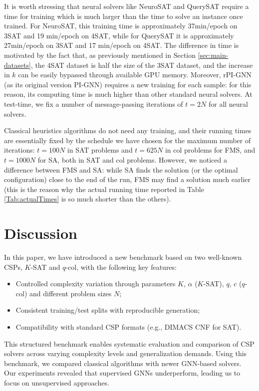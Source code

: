 \documentclass{article}
\begin{document}
It is worth stressing that neural solvers like NeuroSAT and QuerySAT require a time for training which is much larger than the time to solve an instance once trained. For NeuroSAT, this training time is approximately 37min/epoch on 3SAT and 19 min/epoch on 4SAT, while for QuerySAT it is approximately 27min/epoch on 3SAT and 17 min/epoch on 4SAT. The difference in time is motivated by the fact that, as previously mentioned in Section \ref{sec:main-datasets}, the 4SAT dataset is half the size of the 3SAT dataset, and the increase in $k$ can be easily bypassed through available GPU memory. Moreover, rPI-GNN (as its original version PI-GNN) requires a new training for each sample: for this reason, its computing time is much higher than other standard neural solvers. At test-time, we fix a number of message-passing iterations of $t=2N$ for all neural solvers.

Classical heuristics algorithms do not need any training, and their running times are essentially fixed by the schedule we have chosen for the maximum number of iterations: $t=100 N$ in SAT problems and $t=625 N$ in col problems for FMS, and $t=1000N$ for SA, both in SAT and col problems.
However, we noticed a difference between FMS and SA: while SA finds the solution (or the optimal configuration) close to the end of the run, FMS may find a solution much earlier (this is the reason why the actual running time reported in Table \ref{Tab:actualTimes} is so much shorter than the others).


\section{Discussion}

In this paper, we have introduced a new benchmark based on two well-known CSPs, $K$-SAT and $q$-col, with the following key features:
\begin{itemize}
    \item Controlled complexity variation through parameters $K$, $\alpha$ ($K$-SAT), $q$, $c$ ($q$-col) and different problem sizes $N$;
    \item Consistent training/test splits with reproducible generation;
    \item Compatibility with standard CSP formats (e.g., DIMACS CNF for SAT).
\end{itemize}

This structured benchmark enables systematic evaluation and comparison of CSP solvers across varying complexity levels and generalization demands. Using this benchmark, we compared classical algorithms with newer GNN-based solvers. Our experiments revealed that supervised GNNs underperform, leading us to focus on unsupervised approaches.
\end{document}
